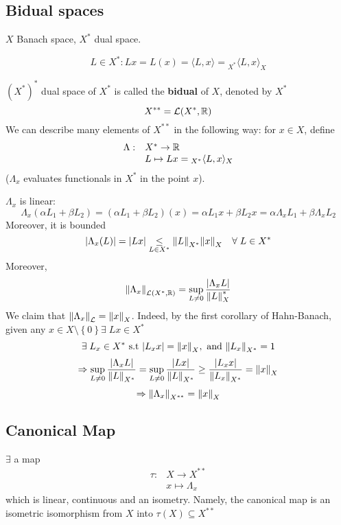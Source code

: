 \subsection{Bidual spaces}
\(X\) Banach space, \(X^*\) dual space.
\begin{notation}
\[L \in X^*: Lx = L(x) = \langle L,x \rangle = {}_{X^*}\langle L,x\rangle_X\]
\end{notation}
\((X^*)^*\) dual space of \(X^*\) is called the \textbf{bidual} of \(X\), denoted by \(X^*\)
\[
    X^{**} = \mathcal{L}(X^*, \mathbb{R})
\]
We can describe many elements of \(X^{**}\) in the following way: for \(x \in X\), define 
\[
    \begin{array}{ll}
        \Lambda: & X^* \to \mathbb{R} \\
        & L \mapsto Lx = {}_{X^*}\langle L,x \rangle_{X}
    \end{array}
\]
(\(\Lambda_x\) evaluates functionals in \(X^*\) in the point \(x\)).

\(\Lambda_x\) is linear:
\[
    \Lambda_x (\alpha L_1 + \beta L_2) = (\alpha L_1 + \beta L_2)(x) = \alpha L_1 x + \beta L_2 x = \alpha \Lambda_x L_1 + \beta \Lambda_x L_2
\]
Moreover, it is bounded 
\[
    \abs{\Lambda_x(L)} = \abs{Lx} \underset{L \in X^*}{\leq} \norm{L}_{X^*}\norm{x}_X \quad \forall \; L \in X^*
\]
Moreover, 
\[
    \norm{\Lambda_x}_{\mathcal{L}(X^*, \mathbb{R})} = \sup_{L \neq 0} \frac{\abs{\Lambda_x L}}{\norm{L}_X^*}
\]
We claim that \(\norm{\Lambda_x}_{\mathcal{L}} = \norm{x}_X\). Indeed, by the first corollary of Hahn-Banach, given any \(x \in X\setminus \left\{ 0 \right\} \exists \; Lx \in X^*\) 
\[
    \exists \; L_x \in X^* \mbox{ s.t } \abs{L_x x} = \norm{x}_X, \mbox{ and } \norm{L_x}_{X^*} = 1 
\]
\[
    \Rightarrow \sup_{L \neq 0} \frac{\abs{\Lambda_x L}}{\norm{L}_{X^*}} = \sup_{L \neq 0} \frac{\abs{Lx}}{\norm{L}_{X^*}} \geq \frac{\abs{L_x x}}{\norm{L_x}_{X^*}} = \norm{x}_X 
\]
\[
    \Rightarrow \norm{\Lambda_x}_{X^{**}} = \norm{x}_X
\]
\subsection{Canonical Map}
\begin{theorem}
    \(\exists\) a map 
    \[
        \begin{array}{lc}
            \tau : & X \to X^{**} \\
            & x \mapsto \Lambda_x
        \end{array}
    \tag*{(Canonical Map)}\]
    which is linear, continuous and an isometry. Namely, the canonical map is an isometric isomorphism from \(X\) into \(\tau(X) \subseteq X^{**}\)
\end{theorem}
